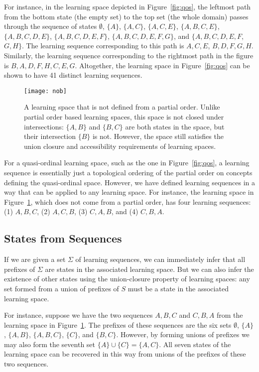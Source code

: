 \documentclass[11pt]{llncs}
\begin{document}
{For instance, in the learning space depicted in Figure~\ref{fig:qos}, the leftmost path from the bottom state (the empty set) to the top set (the whole domain) passes through the sequence of states
$\emptyset$, $\{A\}$, $\{A,C\}$, $\{A,C,E\}$, $\{A,B,C,E\}$, $\{A,B,C,D,E\}$, $\{A,B,C,D,E,F\}$, $\{A,B,C,D,E,F,G\}$, and $\{A,B,C,D,E,F$, $G,H\}$. The learning sequence corresponding to this path is $A,C,E$, $B,D,F,G,H$.
Similarly, the learning sequence corresponding to the rightmost path in the figure is $B,A,D,F,H,C,E,G$.
Altogether, the learning space in Figure~\ref{fig:qos} can be shown to have 41 distinct learning sequences.

\begin{figure}[t]
\centering\texttt{[image: nob]}
\caption{A learning space that is not defined from a partial order. Unlike partial order based learning spaces, this space is not closed under intersections: $\{A,B\}$ and $\{B,C\}$ are both states in the space, but their intersection $\{B\}$ is not. However, the space still satisfies the union closure and accessibility requirements of learning spaces.}
\label{fig:nob}
\end{figure}

For a quasi-ordinal learning space, such as the one in Figure~\ref{fig:qos}, a learning sequence is essentially just a topological ordering of the partial order on concepts defining the quasi-ordinal space. However, we have defined learning sequences in a way that can be applied to any learning space. For instance, the learning space in Figure~\ref{fig:nob}, which does not come from a partial order, has four learning sequences: (1) $A,B,C$, (2) $A,C,B$, (3) $C,A,B$, and (4) $C,B,A$.

\subsection{States from Sequences}

If we are given a set $\Sigma$ of learning sequences, we can immediately infer that all prefixes of $\Sigma$ are states in the associated learning space. But we can also infer the existence of other states using the union-closure property of learning spaces: any set formed from a union of prefixes of $S$ must be a state in the associated learning space.

For instance, suppose we have the two sequences $A,B,C$ and $C,B,A$ from the learning space in Figure~\ref{fig:nob}. The prefixes of these sequences are the six sets $\emptyset$, $\{A\}$, $\{A,B\}$, $\{A,B,C\}$, $\{C\}$, and $\{B,C\}$. However, by forming unions of prefixes we may also form the seventh set $\{A\}\cup\{C\}=\{A,C\}$. All seven states of the learning space can be recovered in this way from unions of the prefixes of these two sequences.

}
\end{document}
